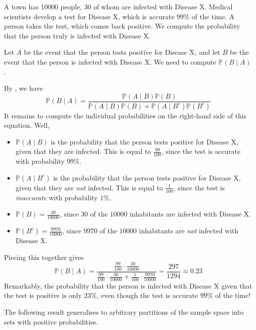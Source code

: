 \begin{example}
A town has $10000$ people, $30$ of whom are infected with Disease X. Medical scientists develop a test for Disease X, which is accurate $99\%$ of the time. A person takes the test, which comes back positive. We compute the probability that the person truly is infected with Disease X.

Let $A$ be the event that the person tests positive for Disease X, and let $B$ be the event that the person is infected with Disease X. We need to compute $\mathbb{P}(B \mid A)$.

By , we have
\[ \mathbb{P}(B \mid A) = \frac{\mathbb{P}(A \mid B)\mathbb{P}(B)}{\mathbb{P}(A \mid B)\mathbb{P}(B) + \mathbb{P}(A \mid B^c)\mathbb{P}(B^c)} \]
It remains to compute the individual probabilities on the right-hand side of this equation. Well,
\begin{itemize}
\item $\mathbb{P}(A \mid B)$ is the probability that the person tests positive for Disease X, given that they are infected. This is equal to $\frac{99}{100}$, since the test is accurate with probability $99\%$.
\item $\mathbb{P}(A \mid B^c)$ is the probability that the person tests positive for Disease X, given that they are \textit{not} infected. This is equal to $\frac{1}{100}$, since the test is \textit{inaccurate} with probability $1\%$.
\item $\mathbb{P}(B) = \frac{30}{10000}$, since $30$ of the $10000$ inhabitants are infected with Disease X.
\item $\mathbb{P}(B^c) = \frac{9970}{10000}$, since $9970$ of the $10000$ inhabitants are \textit{not} infected with Disease X.
\end{itemize}
Piecing this together gives
\[ \mathbb{P}(B \mid A) = \frac{\frac{99}{100} \cdot \frac{30}{10000}}{\frac{99}{100} \cdot \frac{30}{10000} + \frac{1}{100} \cdot \frac{9970}{10000}} = \frac{297}{1294} \approx 0.23 \]
Remarkably, the probability that the person is infected with Disease X given that the test is positive is only $23\%$, even though the test is accurate $99\%$ of the time!
\end{example}

The following result generalises  to arbitrary partitions of the sample space into sets with positive probabilities.

